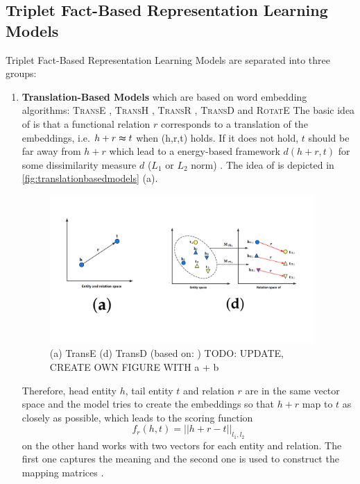 \subsection{Triplet Fact-Based Representation Learning Models} 
\label{subsec:triplet_fact_based_representation_learning_models}


Triplet Fact-Based Representation Learning Models are separated into three groups:
\begin{enumerate}
    \item 
    \textbf{Translation-Based Models}  which are based on word embedding algorithms: 
    \textsc{TransE} \cite{TransE}, \textsc{TransH} \cite{TransH}, \textsc{TransR} \cite{TransR}, \textsc{TransD} \cite{TransD}
    and 
    \textsc{RotatE} \cite{RotatE}
    The basic idea of \transe is that a functional relation $r$ corresponds to a translation of the embeddings, i.e. $h + r \thickapprox t$ when (h,r,t) holds.
    If it does not hold, $t$ should be far away from $h + r$ which lead to a energy-based framework $d(h+r, t)$ for some dissimilarity measure $d$ ($L_1$ or $L_2$ norm) \cite{TransE}.
    The idea of \transe is depicted in \autoref{fig:translationbasedmodels} (a).
    \begin{figure}[t]
      \centering
        \includegraphics[width=0.95\textwidth]{figures/TransE+TransD.png}
      \caption{(a) TransE (d) TransD (based on: \cite{cai2017kbgan}) TODO: UPDATE, CREATE OWN FIGURE WITH a + b}
      \label{fig:translationbasedmodels}
    \end{figure}
    Therefore, head entity $h$, tail entity $t$ and relation $r$ are in the same vector space and the model tries to create the embeddings so that $h+r$ map to $t$ as closely as possible, which leads to the scoring function
    \begin{equation}
        f_r(h,t) = || h + r - t ||_{l_1, l_2}
        \label{eq:transescoringfunction}
    \end{equation}
    \transd on the other hand works with two vectors for each entity and relation.
    The first one captures the meaning and the second one is used to construct the mapping matrices \cite{TransD}.


\end{enumerate}
